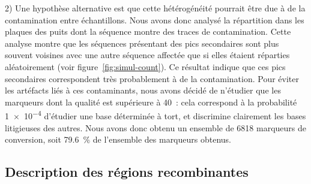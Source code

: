 2) Une hypothèse alternative est que cette hétérogénéité pourrait être due à de
la contamination entre échantillons. Nous avons donc analysé la répartition dans
les plaques des puits dont la séquence montre des traces de contamination. Cette
analyse montre que les séquences présentant des pics secondaires sont plus
souvent voisines avec une autre séquence affectée que si elles étaient réparties
aléatoirement (voir figure~\ref{fig:simul-count}). Ce résultat indique que ces
pics secondaires correspondent très probablement à de la contamination. Pour
éviter les artéfacts liés à ces contaminants, nous avons décidé de n'étudier que
les marqueurs dont la qualité est supérieure à 40~: cela correspond à la
probabilité \num{1e-4} d'étudier une base déterminée à tort, et discrimine
clairement les bases litigieuses des autres. Nous avons donc obtenu un ensemble
de \num{6818} marqueurs de conversion, soit \SI{79.6}{\percent} de l'ensemble
des marqueurs obtenus.

\subsection{Description des régions recombinantes}
\label{subsec:result-descript}

